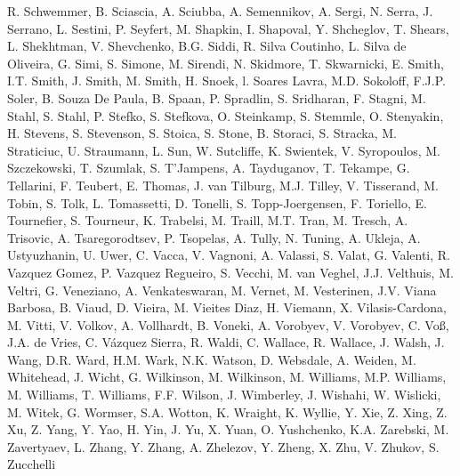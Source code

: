 R. Schwemmer,
B. Sciascia,
A. Sciubba,
A. Semennikov,
A. Sergi,
N. Serra,
J. Serrano,
L. Sestini,
P. Seyfert,
M. Shapkin,
I. Shapoval,
Y. Shcheglov,
T. Shears,
L. Shekhtman,
V. Shevchenko,
B.G. Siddi,
R. Silva Coutinho,
L. Silva de Oliveira,
G. Simi,
S. Simone,
M. Sirendi,
N. Skidmore,
T. Skwarnicki,
E. Smith,
I.T. Smith,
J. Smith,
M. Smith,
H. Snoek,
l. Soares Lavra,
M.D. Sokoloff,
F.J.P. Soler,
B. Souza De Paula,
B. Spaan,
P. Spradlin,
S. Sridharan,
F. Stagni,
M. Stahl,
S. Stahl,
P. Stefko,
S. Stefkova,
O. Steinkamp,
S. Stemmle,
O. Stenyakin,
H. Stevens,
S. Stevenson,
S. Stoica,
S. Stone,
B. Storaci,
S. Stracka,
M. Straticiuc,
U. Straumann,
L. Sun,
W. Sutcliffe,
K. Swientek,
V. Syropoulos,
M. Szczekowski,
T. Szumlak,
S. T'Jampens,
A. Tayduganov,
T. Tekampe,
G. Tellarini,
F. Teubert,
E. Thomas,
J. van Tilburg,
M.J. Tilley,
V. Tisserand,
M. Tobin,
S. Tolk,
L. Tomassetti,
D. Tonelli,
S. Topp-Joergensen,
F. Toriello,
E. Tournefier,
S. Tourneur,
K. Trabelsi,
M. Traill,
M.T. Tran,
M. Tresch,
A. Trisovic,
A. Tsaregorodtsev,
P. Tsopelas,
A. Tully,
N. Tuning,
A. Ukleja,
A. Ustyuzhanin,
U. Uwer,
C. Vacca,
V. Vagnoni,
A. Valassi,
S. Valat,
G. Valenti,
R. Vazquez Gomez,
P. Vazquez Regueiro,
S. Vecchi,
M. van Veghel,
J.J. Velthuis,
M. Veltri,
G. Veneziano,
A. Venkateswaran,
M. Vernet,
M. Vesterinen,
J.V. Viana Barbosa,
B. Viaud,
D.  Vieira,
M. Vieites Diaz,
H. Viemann,
X. Vilasis-Cardona,
M. Vitti,
V. Volkov,
A. Vollhardt,
B. Voneki,
A. Vorobyev,
V. Vorobyev,
C. Vo{\ss},
J.A. de Vries,
C. V{\'a}zquez Sierra,
R. Waldi,
C. Wallace,
R. Wallace,
J. Walsh,
J. Wang,
D.R. Ward,
H.M. Wark,
N.K. Watson,
D. Websdale,
A. Weiden,
M. Whitehead,
J. Wicht,
G. Wilkinson,
M. Wilkinson,
M. Williams,
M.P. Williams,
M. Williams,
T. Williams,
F.F. Wilson,
J. Wimberley,
J. Wishahi,
W. Wislicki,
M. Witek,
G. Wormser,
S.A. Wotton,
K. Wraight,
K. Wyllie,
Y. Xie,
Z. Xing,
Z. Xu,
Z. Yang,
Y. Yao,
H. Yin,
J. Yu,
X. Yuan,
O. Yushchenko,
K.A. Zarebski,
M. Zavertyaev,
L. Zhang,
Y. Zhang,
A. Zhelezov,
Y. Zheng,
X. Zhu,
V. Zhukov,
S. Zucchelli